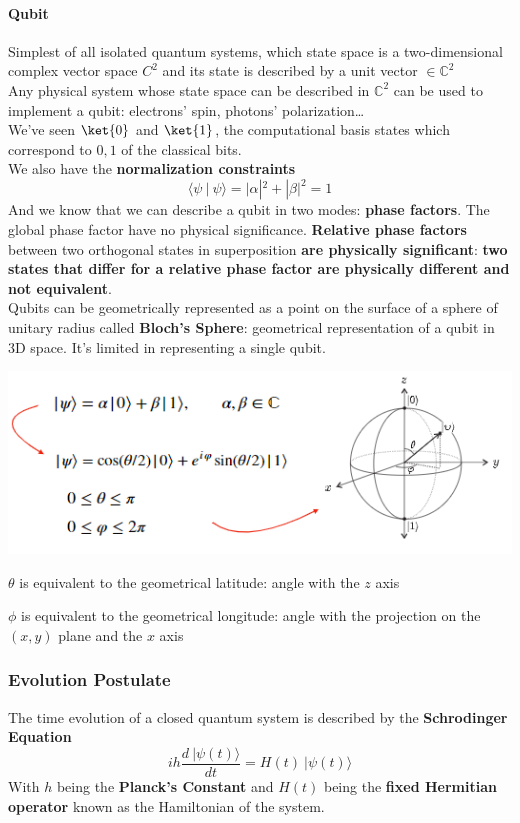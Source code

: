 \documentclass[10pt]{report}
\begin{document}
\paragraph{Qubit} Simplest of all isolated quantum systems, which state space is a two-dimensional complex vector space $C^2$ and its state is described by a unit vector $\in \mathbb{C}^2$\\
Any physical system whose state space can be described in $\mathbb{C}^2$ can be used to implement a qubit: electrons' spin, photons' polarization\ldots\\
We've seen $\ket{0}$ and $\ket{1}$, the computational basis states which correspond to $0,1$ of the classical bits.\\
We also have the \textbf{normalization constraints} $$\langle\psi\:|\:\psi\rangle = |\alpha|^2+|\beta|^2 = 1$$
And we know that we can describe a qubit in two modes: \textbf{phase factors}. The global phase factor have no physical significance. \textbf{Relative phase factors} between two orthogonal states in superposition \textbf{are physically significant}: \textbf{two states that differ for a relative phase factor are physically different and not equivalent}.\\
Qubits can be geometrically represented as a point on the surface of a sphere of unitary radius called \textbf{Bloch's Sphere}: geometrical representation of a qubit in 3D space. It's limited in representing a single qubit.
\begin{center}
	\includegraphics[scale=0.75]{13.png}
\end{center}
\begin{list}{}{}
	\item $\theta$ is equivalent to the geometrical latitude: angle with the $z$ axis
	\item $\phi$ is equivalent to the geometrical longitude: angle with the projection on the $(x,y)$ plane and the $x$ axis
\end{list}
\subsubsection{Evolution Postulate}
The time evolution of a closed quantum system is described by the \textbf{Schrodinger Equation} $$ih\frac{d\:|\psi(t)\rangle}{dt} = H(t)\:|\psi(t)\rangle$$
With $h$ being the \textbf{Planck's Constant} and $H(t)$ being the \textbf{fixed Hermitian operator} known as the Hamiltonian of the system.
\end{document}
